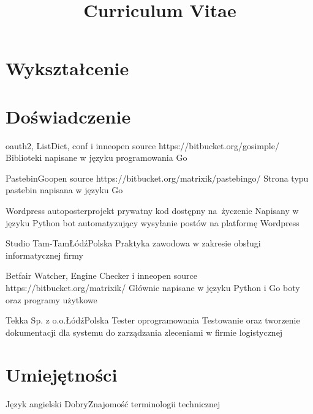 \documentclass[11pt,a4paper,sans,polish]{moderncv}   %
\title{Curriculum Vitae}
\begin{document}
\makecvtitle

\vspace{-0.7cm}


\section{Wykształcenie}

\vspace{-0.2cm}



\section{Doświadczenie}

	{oauth2, ListDict, conf i inne}{open source}{}
	{https://bitbucket.org/gosimple/}
	{Biblioteki napisane w języku programowania Go}

	{PastebinGo}{open source}{}
	{https://bitbucket.org/matrixik/pastebingo/}
	{Strona typu pastebin napisana w języku Go}

	{Wordpress autoposter}{projekt prywatny}{}
	{kod dostępny na~życzenie}
	{Napisany w języku Python bot automatyzujący wysyłanie postów na platformę Wordpress}

	{Studio Tam-Tam}{Łódź}{Polska}
	{}
	{Praktyka zawodowa w zakresie obsługi informatycznej firmy}

	{Betfair Watcher, Engine Checker i inne}{open source}{}
	{https://bitbucket.org/matrixik/}
	{Głównie napisane w języku Python i Go boty oraz programy użytkowe}

	{Tekka Sp. z o.o.}{Łódź}{Polska}
	{Tester oprogramowania}
	{Testowanie oraz tworzenie dokumentacji dla systemu do zarządzania
	zleceniami w firmie logistycznej}


\section{Umiejętności}

\cvitemwithcomment
	{Język angielski}
	{Dobry}{Znajomość terminologii technicznej}
\end{document}
